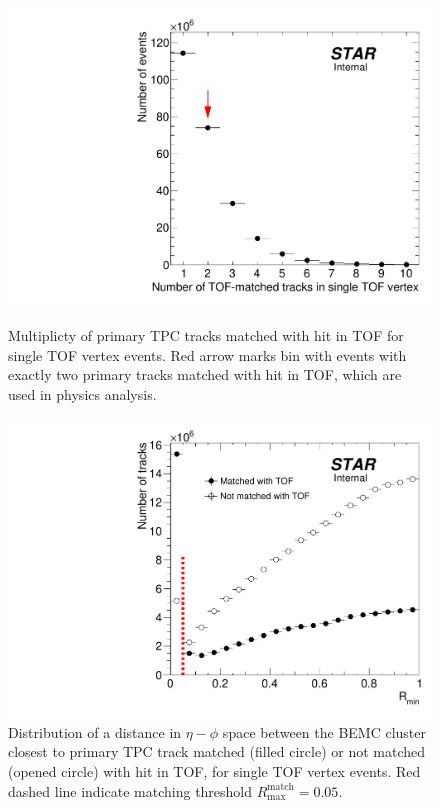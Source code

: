 \begin{figure}[hb!]%
\centering%
\begin{minipage}{.4725\textwidth}%
  \centering%
  \includegraphics[width=\linewidth]{graphics/eventSelection/TpcTracks/NumberOfTofTracksInSingleTofVertex.pdf}%
  \caption[Multiplicty of primary TPC tracks matched with hit in TOF for single TOF vertex events]{Multiplicty of primary TPC tracks matched with hit in TOF for single TOF vertex events. Red arrow marks bin with events with exactly two primary tracks matched with hit in TOF, which are used in physics analysis.\newline}\label{fig:NumberOfTofTracksInSingleTofVertex}
\end{minipage}%
\quad\quad%
\begin{minipage}{.4725\textwidth}%
  \centering
  \includegraphics[width=\linewidth]{graphics/eventSelection/TpcTracks/Rmin.pdf}%
  \caption[Distribution of a distance in $\eta-\phi$ space between the BEMC cluster closest to primary TPC track ($R_{\textrm{min}}$)]{Distribution of a distance in $\eta-\phi$ space between the BEMC cluster closest to primary TPC track matched (filled circle) or not matched (opened circle) with hit in TOF, for single TOF vertex events. Red dashed line indicate matching threshold $R^{\textrm{match}}_{\textrm{max}} = 0.05$.}\label{fig:Rmin} %
\end{minipage}%
\end{figure}%

